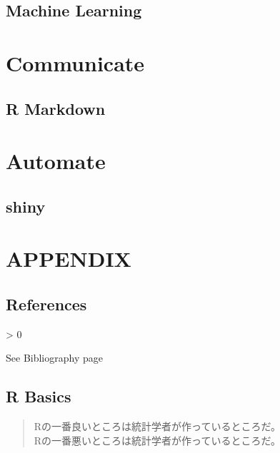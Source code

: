 \documentclass[
  12pt,
]{book}
\newlength{\cslhangindent}
\newenvironment{CSLReferences}[2] %
 {%
  \setlength{\parindent}{0pt}
  \ifodd #1 \everypar{\setlength{\hangindent}{\cslhangindent}}\ignorespaces\fi
  \ifnum #2 > 0
  \setlength{\parskip}{#2\baselineskip}
  \fi
 }%
 {}
\begin{document}
\hypertarget{machine-learning}{%
\chapter{Machine Learning}\label{machine-learning}}

\hypertarget{part-communicate}{%
\part{Communicate}\label{part-communicate}}

\hypertarget{r-markdown}{%
\chapter{R Markdown}\label{r-markdown}}

\hypertarget{part-automate}{%
\part{Automate}\label{part-automate}}

\hypertarget{shiny}{%
\chapter{shiny}\label{shiny}}

\hypertarget{part-appendix}{%
\part{APPENDIX}\label{part-appendix}}

\hypertarget{appendix-appendix}{%
\appendix {}}


\hypertarget{references}{%
\chapter*{References}\label{references}}

\hypertarget{refs}{}
\begin{CSLReferences}{0}{0}
\end{CSLReferences}

See Bibliography page

\hypertarget{Appendix-RBasics}{%
\chapter{R Basics}\label{Appendix-RBasics}}

\begin{quote}
Rの一番良いところは統計学者が作っているところだ。\\
Rの一番悪いところは統計学者が作っているところだ。
\end{quote}
\end{document}
